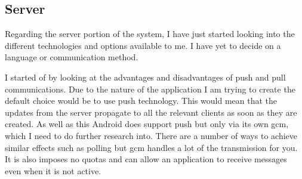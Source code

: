 \documentclass[11pt,fleqn,twoside]{article}
\begin{document}
\subsection{Server}
Regarding the server portion of the system, I have just started looking into the different technologies and options available to me. I have yet to decide on a language or communication method.

I started of by looking at the advantages and disadvantages of \gls{push} and \gls{pull} communications. Due to the nature of the application I am trying to create the default choice would be to use \gls{push} technology. This would mean that the updates from the server propagate to all the relevant clients as soon as they are created. As well as this  Android does support \gls{push} but only via its own \gls{gcm}, which I need to do further research into. There are a number of ways to achieve similar effects such as \gls{polling} but \gls{gcm} handles a lot of the transmission for you. It is also imposes no quotas and can allow an application to receive messages even when it is not active.
\end{document}
